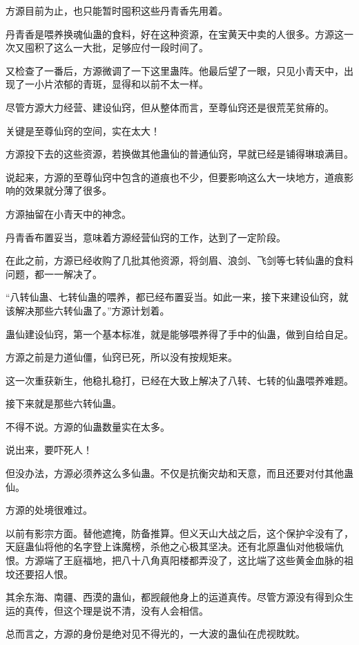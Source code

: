 \begin{this_body}
方源目前为止，也只能暂时囤积这些丹青香先用着。

丹青香是喂养换魂仙蛊的食料，好在这种资源，在宝黄天中卖的人很多。方源这一次又囤积了这么一大批，足够应付一段时间了。

又检查了一番后，方源微调了一下这里蛊阵。他最后望了一眼，只见小青天中，出现了一小片浓郁的青斑，显得和以前不太一样。

尽管方源大力经营、建设仙窍，但从整体而言，至尊仙窍还是很荒芜贫瘠的。

关键是至尊仙窍的空间，实在太大！

方源投下去的这些资源，若换做其他蛊仙的普通仙窍，早就已经是铺得琳琅满目。

说起来，方源的至尊仙窍中包含的道痕也不少，但要影响这么大一块地方，道痕影响的效果就分薄了很多。

方源抽留在小青天中的神念。

丹青香布置妥当，意味着方源经营仙窍的工作，达到了一定阶段。

在此之前，方源已经收购了几批其他资源，将剑眉、浪剑、飞剑等七转仙蛊的食料问题，都一一解决了。

“八转仙蛊、七转仙蛊的喂养，都已经布置妥当。如此一来，接下来建设仙窍，就该解决那些六转仙蛊了。”方源计划着。

蛊仙建设仙窍，第一个基本标准，就是能够喂养得了手中的仙蛊，做到自给自足。

方源之前是力道仙僵，仙窍已死，所以没有按规矩来。

这一次重获新生，他稳扎稳打，已经在大致上解决了八转、七转的仙蛊喂养难题。

接下来就是那些六转仙蛊。

不得不说。方源的仙蛊数量实在太多。

说出来，要吓死人！

但没办法，方源必须养这么多仙蛊。不仅是抗衡灾劫和天意，而且还要对付其他蛊仙。

方源的处境很难过。

以前有影宗方面。替他遮掩，防备推算。但义天山大战之后，这个保护伞没有了，天庭蛊仙将他的名字登上诛魔榜，杀他之心极其坚决。还有北原蛊仙对他极端仇恨。方源端了王庭福地，把八十八角真阳楼都弄没了，这比端了这些黄金血脉的祖坟还要招人恨。

其余东海、南疆、西漠的蛊仙，都觊觎他身上的运道真传。尽管方源没有得到众生运的真传，但这个理是说不清，没有人会相信。

总而言之，方源的身份是绝对见不得光的，一大波的蛊仙在虎视眈眈。


\end{this_body}
